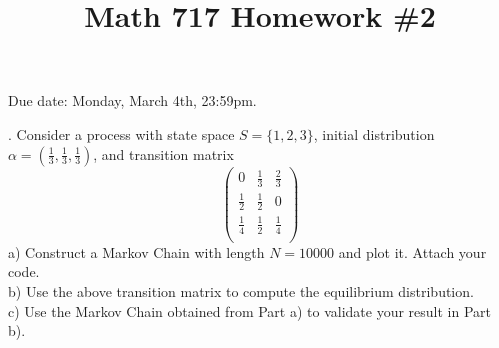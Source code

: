 \documentclass[a4paper,notitlepage,cs4size,cap,indent,oneside,12pt]{article}
\title{Math 717 Homework \#2}
\author{}
\date{}
\numberwithin{equation}{section}
\numberwithin{figure}{section}
\begin{document}
\maketitle%
Due date: Monday, March 4th, 23:59pm.\medskip

. Consider a process with state space $S = \{1, 2, 3\}$, initial distribution $\alpha = (\frac{1}{3}, \frac{1}{3}, \frac{1}{3})$,
and transition matrix
\begin{equation*}
\left(
  \begin{array}{ccc}
    0 & \frac{1}{3} & \frac{2}{3} \\
    \frac{1}{2} & \frac{1}{2} & 0 \\
    \frac{1}{4} & \frac{1}{2} & \frac{1}{4} \\
  \end{array}
\right)
\end{equation*}
a) Construct a Markov Chain with length $N=10000$ and plot it. Attach your code.\\
b) Use the above transition matrix to compute the equilibrium distribution.\\
c) Use the Markov Chain obtained from Part a) to validate your result in Part b).\\
\end{document}

